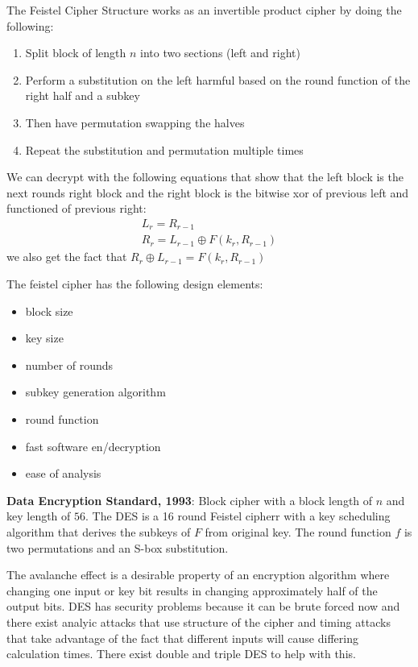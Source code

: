 \documentclass[11pt]{article}
\begin{document}
The Feistel Cipher Structure works as an invertible product cipher by doing the following:
\begin{enumerate}
    \item Split block of length $n$ into two sections (left and right)
    \item Perform a substitution on the left harmful based on the round function of the right half and a subkey
    \item Then have permutation swapping the halves
    \item Repeat the substitution and permutation multiple times
\end{enumerate}
We can decrypt with the following equations that show that the left block is the next rounds right block and the right block is the bitwise xor of previous left and functioned of previous right:
\begin{gather}
    L_r = R_{r-1} \\
    R_r = L_{r-1} \oplus F(k_r, R_{r-1})
\end{gather}
we also get the fact that $R_r \oplus L_{r-1} = F(k_r, R_{r-1})$

The feistel cipher has the following design elements:
\begin{itemize}
    \item block size 
    \item key size
    \item number of rounds
    \item subkey generation algorithm
    \item round function
    \item fast software en/decryption
    \item ease of analysis
\end{itemize}

\textbf{Data Encryption Standard, 1993}:
Block cipher with a block length of $n$ and key length of $56$.
The DES is a 16 round Feistel cipherr with a key scheduling algorithm that derives the subkeys of $F$ from original key.
The round function $f$ is two permutations and an S-box substitution.

The avalanche effect is a desirable property of an encryption algorithm where changing one input or key bit results in changing approximately half of the output bits.
DES has security problems because it can be brute forced now and there exist analyic attacks that use structure of the cipher and timing attacks that take advantage of the fact that different inputs will cause differing calculation times.
There exist double and triple DES to help with this.
\end{document}
